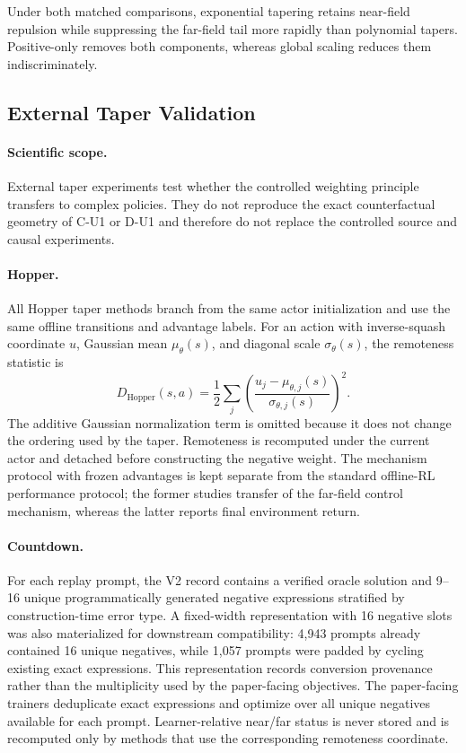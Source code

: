 \documentclass{article}
\theoremstyle{plain}
\theoremstyle{definition}
\theoremstyle{remark}
\begin{document}
Under both matched comparisons, exponential tapering retains near-field
repulsion while suppressing the far-field tail more rapidly than polynomial
tapers. Positive-only removes both components, whereas global scaling reduces
them indiscriminately.



\subsection{External Taper Validation}
\label{app:external_taper_protocol}

\paragraph{Scientific scope.}
External taper experiments test whether the controlled weighting
principle transfers to complex policies. They do not reproduce the exact
counterfactual geometry of C-U1 or D-U1 and therefore do not replace the
controlled source and causal experiments.

\paragraph{Hopper.}
All Hopper taper methods branch from the same actor initialization and
use the same offline transitions and advantage labels. For an action
with inverse-squash coordinate $u$, Gaussian mean $\mu_\theta(s)$, and
diagonal scale $\sigma_\theta(s)$, the remoteness statistic is
\begin{equation}
    D_{\mathrm{Hopper}}(s,a)
    =
    \frac{1}{2}
    \sum_j
    \left(
        \frac{
            u_j-\mu_{\theta,j}(s)
        }{
            \sigma_{\theta,j}(s)
        }
    \right)^2.
    \label{eq:hopper_taper_remoteness}
\end{equation}
The additive Gaussian normalization term is omitted because it does not
change the ordering used by the taper. Remoteness is recomputed under
the current actor and detached before constructing the negative weight.
The mechanism protocol with frozen advantages is kept separate from the
standard offline-RL performance protocol; the former studies transfer of
the far-field control mechanism, whereas the latter reports final
environment return.

\paragraph{Countdown.}
For each replay prompt, the V2 record contains a verified oracle
solution and 9--16 unique programmatically generated negative
expressions stratified by construction-time error type. A fixed-width
representation with 16 negative slots was also materialized for
downstream compatibility: 4{,}943 prompts already contained 16 unique
negatives, while 1{,}057 prompts were padded by cycling existing exact
expressions. This representation records conversion provenance rather
than the multiplicity used by the paper-facing objectives. The
paper-facing trainers deduplicate exact expressions and optimize over
all unique negatives available for each prompt. Learner-relative
near/far status is never stored and is recomputed only by methods that
use the corresponding remoteness coordinate.
\end{document}
